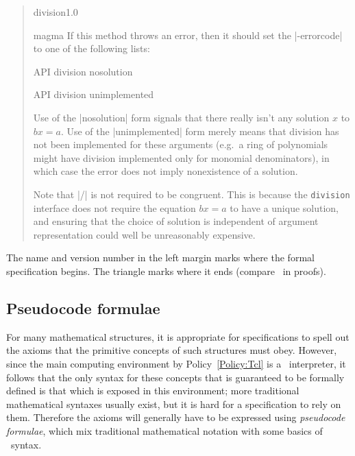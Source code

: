 \documentclass{mtmtcl}
\theoremstyle{plain}
\theoremstyle{remark}
\begin{document}
\begin{quote}
\begin{APIspec}{division}{1.0}
\begin{APIdescription}{magma}
        If this method throws an error, then it should set the 
        |-errorcode| to one of the following lists:
        \begin{displaysyntax}
          API division nosolution\par
          API division unimplemented
        \end{displaysyntax}
        Use of the |nosolution| form signals that there really isn't 
        any solution $x$ to \(bx=a\). Use of the |unimplemented| form 
        merely means that division has not been implemented for these 
        arguments (e.g.~a ring of polynomials might have division 
        implemented only for monomial denominators), in which case 
        the error does not imply nonexistence of a solution.
    \end{APIdescription}
    
    Note that |/| is not required to be congruent. This is 
    because the \texttt{division} interface does not require the 
    equation \(bx=a\) to have a unique solution, and 
    ensuring that the choice of solution is independent of 
    argument representation could well be unreasonably expensive. 
  \end{APIspec}
\end{quote}
The name and version number in the left margin marks where the formal 
specification begins. The triangle marks where it ends (compare 
\qedsymbol\ in proofs).


\subsection{Pseudocode formulae}

For many mathematical structures, it is appropriate for 
specifications to spell out the axioms that the primitive concepts of 
such structures must obey. However, since the main computing environment 
by Policy~\ref{Policy:Tcl} is a \Tcl\ interpreter, it follows that the 
only syntax for these concepts that is guaranteed to be formally defined 
is that which is exposed in this environment; more traditional 
mathematical syntaxes usually exist, but it is hard for a 
specification to rely on them. 
Therefore the axioms will generally have to be expressed using 
\emph{pseudocode formulae}, which mix traditional mathematical 
notation with some basics of \Tcl\ syntax.
\end{document}

